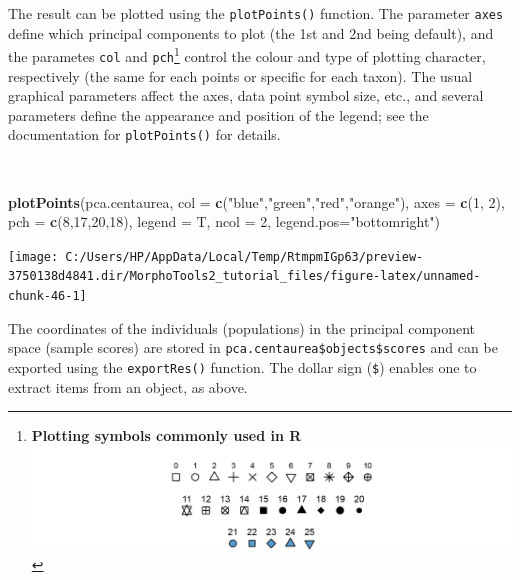 \documentclass[
]{article}
\newenvironment{Shaded}{\begin{snugshade}}{\end{snugshade}}
\newcommand{\DataTypeTok}[1]{\textcolor[rgb]{0.13,0.29,0.53}{#1}}
\newcommand{\DecValTok}[1]{\textcolor[rgb]{0.00,0.00,0.81}{#1}}
\newcommand{\KeywordTok}[1]{\textcolor[rgb]{0.13,0.29,0.53}{\textbf{#1}}}
\newcommand{\NormalTok}[1]{#1}
\newcommand{\StringTok}[1]{\textcolor[rgb]{0.31,0.60,0.02}{#1}}
\begin{document}
The result can be plotted using the \texttt{plotPoints()} function. The
parameter \texttt{axes} define which principal components to plot (the
1st and 2nd being default), and the parametes \texttt{col} and
\texttt{pch}\footnote{\textbf{Plotting symbols commonly used in R}\\
  \includegraphics[width=1\textwidth,height=\textheight]{./pch.png}}
control the colour and type of plotting character, respectively (the
same for each points or specific for each taxon). The usual graphical
parameters affect the axes, data point symbol size, etc., and several
parameters define the appearance and position of the legend; see the
documentation for \texttt{plotPoints()} for details.

~

\begin{Shaded}
\begin{Highlighting}[]
\KeywordTok{plotPoints}\NormalTok{(pca.centaurea, }\DataTypeTok{col =} \KeywordTok{c}\NormalTok{(}\StringTok{"blue"}\NormalTok{,}\StringTok{"green"}\NormalTok{,}\StringTok{"red"}\NormalTok{,}\StringTok{"orange"}\NormalTok{), }\DataTypeTok{axes =} \KeywordTok{c}\NormalTok{(}\DecValTok{1}\NormalTok{, }\DecValTok{2}\NormalTok{),}
           \DataTypeTok{pch =} \KeywordTok{c}\NormalTok{(}\DecValTok{8}\NormalTok{,}\DecValTok{17}\NormalTok{,}\DecValTok{20}\NormalTok{,}\DecValTok{18}\NormalTok{), }\DataTypeTok{legend =}\NormalTok{ T, }\DataTypeTok{ncol =} \DecValTok{2}\NormalTok{, }\DataTypeTok{legend.pos=}\StringTok{"bottomright"}\NormalTok{)}
\end{Highlighting}
\end{Shaded}

\begin{center}\texttt{[image: C:/Users/HP/AppData/Local/Temp/RtmpmIGp63/preview-3750138d4841.dir/MorphoTools2\_tutorial\_files/figure-latex/unnamed-chunk-46-1]} \end{center}

The coordinates of the individuals (populations) in the principal
component space (sample scores) are stored in
\texttt{pca.centaurea\$objects\$scores} and can be exported using the
\texttt{exportRes()} function. The dollar sign (\texttt{\$}) enables one
to extract items from an object, as above.
\end{document}
